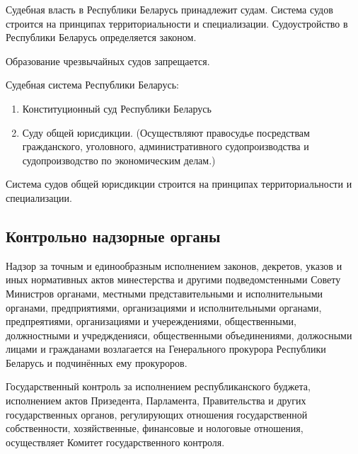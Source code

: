 \documentclass[14pt]{extarticle}
\begin{document}
	Судебная власть в Республики Беларусь принадлежит судам. Система судов строится на принципах территориальности и специализации. Судоустройство в Республики Беларусь определяется законом. 
	
	Образование чрезвычайных судов запрещается.
	
	Судебная система Республики Беларусь:
	\begin{enumerate}
		\item Конституционный суд Республики Беларусь
		\item Суду общей юрисдикции. (Осуществляют правосудье посредствам гражданского, уголовного, административного судопроизводства и судопроизводство по экономическим делам.)
	\end{enumerate}
	Система судов общей юрисдикции строится на принципах территориальности и специализации.
	
	\subsection{Контрольно надзорные органы}
	
	Надзор за точным и единообразным исполнением законов, декретов, указов и иных нормативных актов минестерства и другими подведомстенными Совету Министров органами, местными представительными и исполнительными органами, предприятиями, организациями и исполнительными органами, предпреятиями, организациями и учереждениями, общественными, должностными и учреджденияси, общественными объединениями, должосными лицами и гражданами возлагается на Генерального прокурора Республики Беларусь и подчинённых ему прокуроров.
	
	Государственный контроль за исполнением республиканского буджета, исполнением актов Призедента, Парламента, Правительства и других государственных органов, регулирующих отношения государственной собственности, хозяйственные, финансовые и нологовые отношения, осуществляет Комитет государственного контроля.
\end{document}
